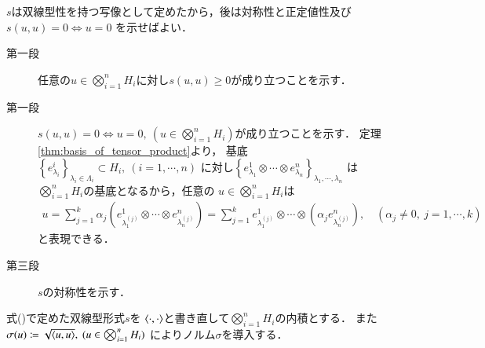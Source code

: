 	\begin{prf} $s$は双線型性を持つ写像として定めたから，後は対称性と正定値性及び$s(u,u)=0 \Leftrightarrow u=0$
		を示せばよい．
		\begin{description}
			\item[第一段]
				任意の$u \in \bigotimes_{i=1}^n H_i$に対し$s(u,u) \geq 0$が成り立つことを示す．
				
			\item[第一段]
				$s(u,u)=0 \Leftrightarrow u=0,\ (u \in \bigotimes_{i=1}^n H_i)$が成り立つことを示す．
				定理\ref{thm:basis_of_tensor_product}より，
				基底$\left\{ e^i_{\lambda_i} \right\}_{\lambda_i \in \Lambda_i} \subset H_i,\ (i=1,\cdots,n)$
				に対し$\left\{ e^1_{\lambda_1} \otimes \cdots \otimes e^n_{\lambda_n} \right\}_{\lambda_1,\cdots,\lambda_n}$
				は$\bigotimes_{i=1}^n H_i$の基底となるから，任意の
				$u \in \bigotimes_{i=1}^n H_i$は
				\begin{align}
					u = \sum_{j=1}^k \alpha_j \left( e^1_{\lambda^{(j)}_1} \otimes \cdots \otimes e^n_{\lambda^{(j)}_n} \right)
					= \sum_{j=1}^k e^1_{\lambda^{(j)}_1} \otimes \cdots \otimes \left( \alpha_j e^n_{\lambda^{(j)}_n} \right),
					\quad (\alpha_j \neq 0,\ j=1,\cdots,k)
				\end{align}
				と表現できる．
			
			\item[第三段]
				$s$の対称性を示す．
		\end{description}
	\end{prf}
	
	\begin{screen}
		\begin{dfn}[テンソル積上の内積]
			式()で定めた双線型形式$s$を
			$\inprod<\cdot,\cdot>$と書き直して$\bigotimes_{i=1}^n H_i$の内積とする．
			また$\sigma(u) \coloneqq \sqrt{\inprod<u,u>},\ (u \in \bigotimes_{i=1}^n H_i)$
			によりノルム$\sigma$を導入する．
		\end{dfn}
	\end{screen}
	
	\begin{screen}
		\begin{thm}
		\end{thm}
	\end{screen}
	
